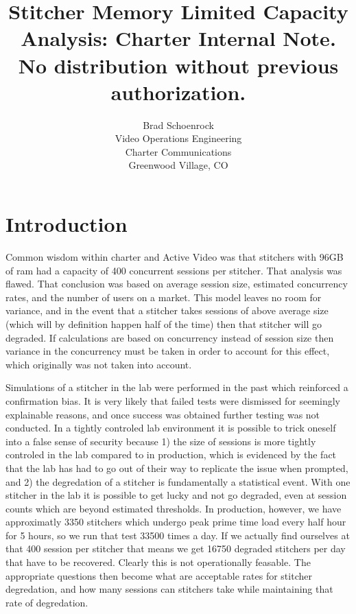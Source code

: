 \documentclass{article}
\author{Brad Schoenrock\\Video Operations Engineering\\Charter Communications\\Greenwood Village, CO}
\title{Stitcher Memory Limited Capacity Analysis: Charter Internal Note. No distribution without previous authorization.}
\date{}
\begin{document}
\maketitle



\section{Introduction}

Common wisdom within charter and Active Video was that stitchers with 96GB of ram had a capacity of 400 concurrent sessions per stitcher. That analysis was flawed. That conclusion was based on average session size, estimated concurrency rates, and the number of users on a market. This model leaves no room for variance, and in the event that a stitcher takes sessions of above average size (which will by definition happen half of the time) then that stitcher will go degraded. If calculations are based on concurrency instead of session size then variance in the concurrency must be taken in order to account for this effect, which originally was not taken into account. 

Simulations of a stitcher in the lab were performed in the past which reinforced a confirmation bias. It is very likely that failed tests were dismissed for seemingly explainable reasons, and once success was obtained further testing was not conducted. In a tightly controled lab environment it is possible to trick oneself into a false sense of security because 1) the size of sessions is more tightly controled in the lab compared to in production, which is evidenced by the fact that the lab has had to go out of their way to replicate the issue when prompted, and 2) the degredation of a stitcher is fundamentally a statistical event. With one stitcher in the lab it is possible to get lucky and not go degraded, even at session counts which are beyond estimated thresholds. In production, however, we have approximatly 3350 stitchers which undergo peak prime time load every half hour for 5 hours, so we run that test 33500 times a day. If we actually find ourselves at that 400 session per stitcher that means we get 16750 degraded stitchers per day that have to be recovered. Clearly this is not operationally feasable. The appropriate questions then become what are acceptable rates for stitcher degredation, and how many sessions can stitchers take while maintaining that rate of degredation. 
\end{document}
